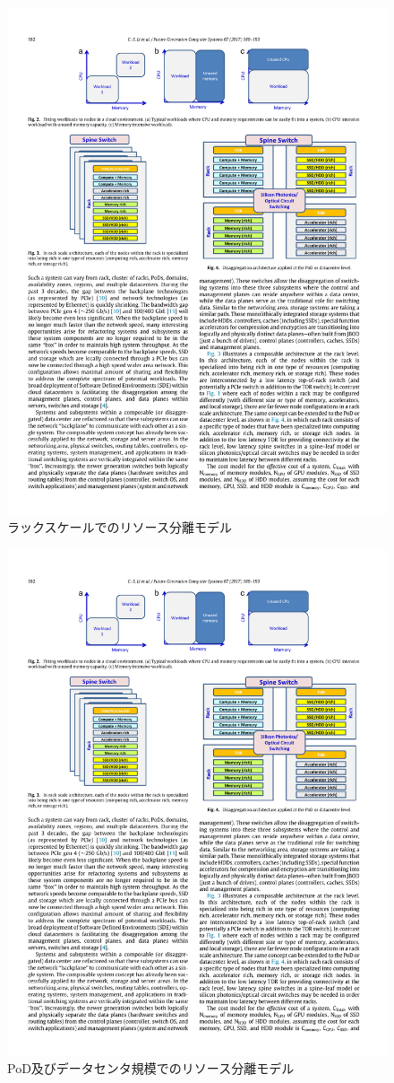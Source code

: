 \documentclass[a4j]{ujarticle}
\begin{document}
\begin{figure}[htbp]
  \centering
  \includegraphics[width=0.7\hsize]{rack.pdf}
  \caption{ラックスケールでのリソース分離モデル}
  \label{rack}
\end{figure}
\begin{figure}[htbp]
  \centering
  \includegraphics[width=0.7\hsize]{PoD_Data.pdf}
  \caption{PoD及びデータセンタ規模でのリソース分離モデル}
  \label{PoD_Data}
\end{figure}
\end{document}
